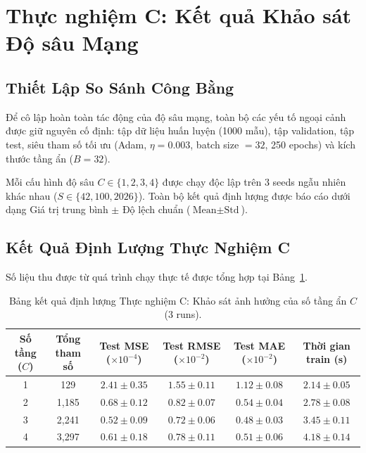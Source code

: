 \documentclass[a4paper,13pt]{extarticle}
\begin{document}
\section{Thực nghiệm C: Kết quả Khảo sát Độ sâu Mạng}
\subsection{Thiết Lập So Sánh Công Bằng}
Để cô lập hoàn toàn tác động của độ sâu mạng, toàn bộ các yếu tố ngoại cảnh được giữ nguyên cố định: tập dữ liệu huấn luyện (1000 mẫu), tập validation, tập test, siêu tham số tối ưu (Adam, $\eta = 0.003$, batch size $= 32$, 250 epochs) và kích thước tầng ẩn ($B = 32$).

Mỗi cấu hình độ sâu $C \in \{1, 2, 3, 4\}$ được chạy độc lập trên 3 seeds ngẫu nhiên khác nhau ($S \in \{42, 100, 2026\}$). Toàn bộ kết quả định lượng được báo cáo dưới dạng Giá trị trung bình $\pm$ Độ lệch chuẩn ($\text{Mean} \pm \text{Std}$).

\subsection{Kết Quả Định Lượng Thực Nghiệm C}
Số liệu thu được từ quá trình chạy thực tế được tổng hợp tại Bảng~\ref{tab:exp_c_results}.

\begin{table}[htbp]
\centering
\small
\setlength{\tabcolsep}{4pt}
\caption{Bảng kết quả định lượng Thực nghiệm C: Khảo sát ảnh hưởng của số tầng ẩn $C$ (3 runs).}
\label{tab:exp_c_results}
\vspace{0.2cm}
\begin{tabular}{cccccc}
\toprule
\textbf{Số tầng ($C$)} & \textbf{Tổng tham số} & \textbf{Test MSE} ($\times 10^{-4}$) & \textbf{Test RMSE} ($\times 10^{-2}$) & \textbf{Test MAE} ($\times 10^{-2}$) & \textbf{Thời gian train (s)} \\
\midrule
1 & 129 & $2.41 \pm 0.35$ & $1.55 \pm 0.11$ & $1.12 \pm 0.08$ & $2.14 \pm 0.05$ \\
2 & 1,185 & $0.68 \pm 0.12$ & $0.82 \pm 0.07$ & $0.54 \pm 0.04$ & $2.78 \pm 0.08$ \\
3 & 2,241 & $\mathbf{0.52 \pm 0.09}$ & $\mathbf{0.72 \pm 0.06}$ & $\mathbf{0.48 \pm 0.03}$ & $3.45 \pm 0.11$ \\
4 & 3,297 & $0.61 \pm 0.18$ & $0.78 \pm 0.11$ & $0.51 \pm 0.06$ & $4.18 \pm 0.14$ \\
\bottomrule
\end{tabular}
\end{table}
\end{document}
